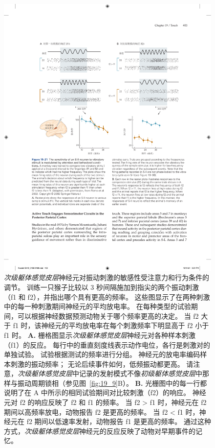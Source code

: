 \begin{figure}[htbp]
	\centering
	\includegraphics[width=1.0\linewidth]{chap19/fig_19_21}
	\caption{\textit{次级躯体感觉皮层}神经元对振动刺激的敏感性受注意力和行为条件的调节。
		训练一只猴子比较以 3 秒间隔施加到指尖的两个振动刺激（f1 和 f2），并指出哪个具有更高的频率。
		这些图显示了在两种刺激中的每一种刺激期间神经元的平均放电率。
		在每种类型的试验期间，可以根据神经数据预测动物关于哪个频率更高的决定。
		当 f2 大于 f1 时，该神经元的平均放电率在每个刺激频率下明显高于 f2 小于 f1 时\cite{romo2002neuronal}。
		\textbf{A.} 栅格图显示\textit{次级躯体感觉皮层}神经元对各种样本刺激（f1）的反应。
		每行中的垂直刻度线表示动作电位，各行是刺激对的单独试验。
		试验根据测试的频率进行分组。
		神经元的放电率编码样本刺激的振动频率； 无论后续事件如何，低频振动都更高。
		请注意，\textit{次级躯体感觉皮层}中记录的发射模式不像\textit{初级躯体感觉皮层}中那样与振动周期锁相（参见图~\ref{fig:19_9}B）。
		\textbf{B.} 光栅图中的每一行都说明了在 A 中所示的相同试验期间对比较刺激（f2）的响应。
		神经元对 f2 的响应反映了 f2 和 f1 的频率。
		当 f2 > f1 时，神经元在 f2 期间以高频率放电，动物报告 f2 是更高的频率。
		当 f2 < f1 时，神经元在 f2 期间以低速率发射，动物报告 f1 是更高的频率。
		通过这种方式，\textit{次级躯体感觉皮层}神经元的反应反映了动物对早期事件的记忆。}
	\label{fig:19_21}
\end{figure}


